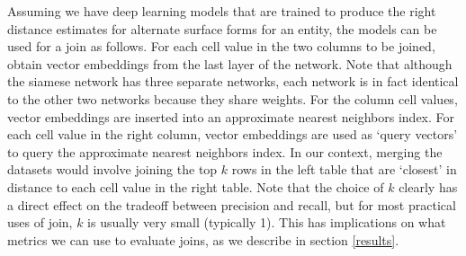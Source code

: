

Assuming we have deep learning models that are trained to produce the right distance estimates for alternate surface forms for an entity, the models can be used for a join as follows.  For each cell value in the two columns to be joined, obtain vector embeddings from the last layer of the network.  Note that although the siamese network has three separate networks, each network is in fact identical to the other two networks because they share weights.  For the column cell values, vector embeddings are inserted into an approximate nearest neighbors index.  For each cell value in the right column, vector embeddings are used as `query vectors' to query the approximate nearest neighbors index.  In our context, merging the datasets would involve joining the top $k$ rows in the left table that are `closest' in distance to each cell value in the right table.  Note that the choice of $k$ clearly has a direct effect on the tradeoff between precision and recall, but for most practical uses of join, $k$ is usually very small (typically 1).  This has implications on what metrics we can use to evaluate joins, as we describe in section \ref{results}.

